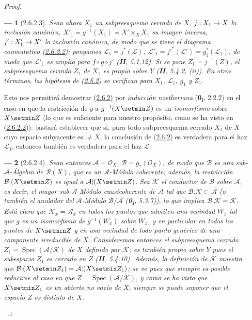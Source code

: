 \documentclass[10pt,oneside,openany]{book}
\theoremstyle{egaenv}\newtheorem*{env}{---}
\theoremstyle{egastatement}
\theoremstyle{egadescription}
\newcommand{\oldpage}[2][]{\marginnote{\normalfont\scriptsize\textbf{#1}\,|\,#2}\ignorespaces}
\renewcommand{\to}{\mathchoice{\longrightarrow}{\rightarrow}{\rightarrow}{\rightarrow}}
\begin{document}
\begin{proof}
\begin{env}[2.6.2.3]
\label{III.2.6.2.3-fr}
Sean ahora $X_1$ un \emph{subpreesquema cerrado} de $X$,
$j:X_1\to X$ la inclusión canónica,
$X'_1=g^{-1}(X_1)=X'\times_X X_1$ su imagen inversa,
$j':X'_1\to X'$ la inclusión canónica, de modo que se tiene el diagrama
conmutativo (\hyperref[III.2.6.2.2-fr]{2.6.2.2}); pongamos
$\mathcal L_1=j^*(\mathcal L)$,
$\mathcal L'_1=j'^*(\mathcal L')=g_1^*(\mathcal L_1)$, de modo que
$\mathcal L'_1$ es amplio para $f\circ g\circ j'$ (\textbf{II}, 5.1.12). Si se
pone $Z_1=j^{-1}(Z)$, el subpreesquema cerrado $Z_1$ de $X_1$ es propio
sobre $Y$ (\textbf{II}, 5.4.2, (ii)). En otros términos, \emph{las hipótesis de}
(\hyperref[III.2.6.2-fr]{2.6.2}) \emph{se verifican para} $X_1$,
$\mathcal L_1$, $g_1$ y $Z_1$.
\end{env}

\oldpage[III]{113}
Esto nos permitirá demostrar
(\hyperref[III.2.6.2-fr]{2.6.2}) por \emph{inducción noetheriana}
(\textbf{0}\textsubscript{I}, 2.2.2) en el caso en que la restricción de $g$ a
$g^{-1}(X\setmin Z)$ es un \emph{isomorfismo} sobre $X\setmin Z$ (lo que es suficiente para
nuestro propósito, como se ha visto en
(\hyperref[III.2.6.2.2-fr]{2.6.2.2})): bastará establecer que si, para
todo subpreesquema cerrado $X_1$ de $X$ cuyo espacio subyacente es
$\neq X$, la conclusión de (\hyperref[III.2.6.2-fr]{2.6.2}) es verdadera
para el haz $\mathcal L_1$, entonces también es verdadera para el
haz $\mathcal L$.

\begin{env}[2.6.2.4]
\label{III.2.6.2.4-fr}
Sean entonces $\mathcal A=\mathcal O_X$, $\mathcal B=g_*(\mathcal O_X)$,
de modo que $\mathcal B$ es una sub-$\mathcal A$-Álgebra de
$\mathcal R(X)$, que es un $\mathcal A$-Módulo coherente; además, la
restricción $\mathcal B|(X\setmin Z)$ es igual a $\mathcal A|(X\setmin Z)$. Sea
$\mathcal K$ el \emph{conductor} de $\mathcal B$ sobre $\mathcal A$, es decir,
el mayor sub-$\mathcal A$-Módulo cuasicoherente de $\mathcal A$ tal
que $\mathcal B.\mathcal K\subset\mathcal A$ (o también el \emph{anulador} del
$\mathcal A$-Módulo $\mathcal B/\mathcal A$
(\textbf{0}\textsubscript{I}, 5.3.7)), lo que implica
$\mathcal B.\mathcal K=\mathcal K$. Está claro que
$\mathcal K_x=\mathcal A_x$ en todos los puntos que admiten una vecindad
$W_x$ tal que $g$ es un isomorfismo de $g^{-1}(W_x)$ sobre $W_x$, y en
particular en todos los puntos de $X\setmin Z$ y en una vecindad de todo
punto genérico de una componente irreducible de $X$. Consideremos entonces
el subpreesquema cerrado $Z_1=\operatorname{Spec}(\mathcal A/\mathcal K)$
de $X$ definido por $\mathcal K$; es también \emph{propio} sobre $Y$ pues el
subespacio $Z_1$ es cerrado en $Z$ (\textbf{II}, 5.4.10). Además, la definición
de $\mathcal K$ muestra que
$\mathcal B|(X\setmin Z_1)=\mathcal A|(X\setmin Z_1)$; se ve pues que siempre es posible
reducirse al caso en que
$Z=\operatorname{Spec}(\mathcal A/\mathcal K)$, y como se ha visto que
$X\setmin Z_1$ es un abierto no vacío de $X$, siempre se puede suponer que
el espacio $Z$ es \emph{distinto} de $X$.
\end{env}


\end{proof}
\end{document}
